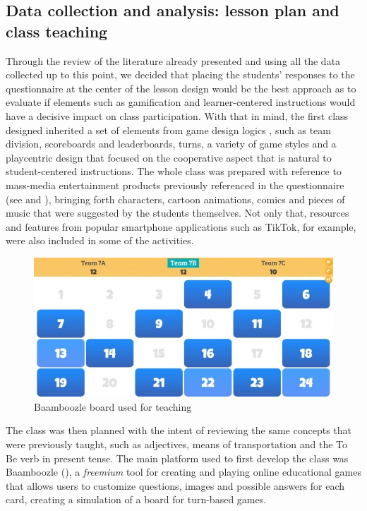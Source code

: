 \documentclass[english]{textolivre}
\begin{document}
\subsection{Data collection and analysis: lesson plan and class teaching}

Through the review of the literature already presented and using all the data collected up to this point, we decided that placing the students’ responses to the questionnaire at the center of the lesson design would be the best approach as to evaluate if elements such as gamification and learner-centered instructions would have a decisive impact on class participation. With that in mind, the first class designed inherited a set of elements from game design logics \cite{deterding2011game}, such as team division, scoreboards and leaderboards, turns, a variety of game styles and a playcentric design that focused on the cooperative aspect \cite{felder1996navigating} that is natural to student-centered instructions. The whole class was prepared with reference to mass-media entertainment products previously referenced in the questionnaire (see  and ), bringing forth characters, cartoon animations, comics and pieces of music that were suggested by the students themselves. Not only that, resources and features from popular smartphone applications such as TikTok, for example, were also included in some of the activities.

\begin{figure}[htbp]
\centering
\begin{minipage}{.8\textwidth}
 \includegraphics[width=\textwidth]{Fig3.jpg}
 \caption{Baamboozle board used for teaching}
 \label{fig03}
\end{minipage}
\end{figure}

The class was then planned with the intent of reviewing the same concepts that were previously taught, such as adjectives, means of transportation and the To Be verb in present tense. The main platform used to first develop the class was Baamboozle (), a \emph{freemium} tool for creating and playing online educational games that allows users to customize questions, images and possible answers for each card, creating a simulation of a board for turn-based games.
\end{document}
